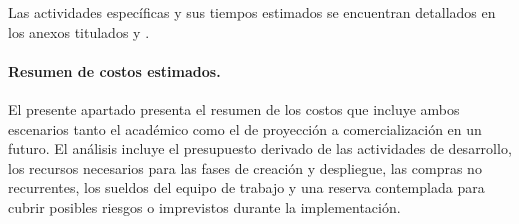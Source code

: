 Las actividades específicas y sus tiempos estimados se encuentran detallados en los anexos titulados \textbf{} y \textbf{} .


\paragraph{\textbf{Resumen de costos estimados.}}
El presente apartado presenta el resumen de los costos que incluye ambos escenarios tanto el académico como el de proyección a comercialización en un futuro. El análisis incluye el presupuesto derivado de las actividades de desarrollo, los recursos necesarios para las fases de creación y despliegue, las compras no recurrentes, los sueldos del equipo de trabajo y una reserva contemplada para cubrir posibles riesgos o imprevistos durante la implementación.

\begin{table}[H]
	\centering
	\renewcommand{\arraystretch}{1.5}
	\setlength{\tabcolsep}{12pt}
	\caption[Resumen de costos estimados para el desarrollo y despliegue en el escenario académico]{Resumen de costos estimados para el desarrollo y despliegue en el escenario académico, elaboración propia.}	
	\label{tab:costos_academico}
\end{table}

